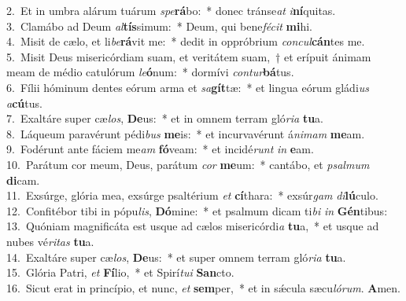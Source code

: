 {2.~}Et in umbra alárum tuárum \textit{spe}\textbf{rá}bo:~* donec tránse\textit{at} \textit{i}\textbf{ní}quitas.\\
{3.~}Clamábo ad Deum \textit{al}\textbf{tís}simum:~* Deum, qui bene\textit{fé}\textit{cit} \textbf{mi}hi.\\
{4.~}Misit de cælo, et li\textit{be}\textbf{rá}vit me:~* dedit in oppróbrium \textit{con}\textit{cul}\textbf{cán}tes me.\\
{5.~}Misit Deus misericórdiam suam, et veritátem suam,~† et erípuit ánimam meam de médio catulórum \textit{le}\textbf{ó}num:~* dormívi \textit{con}\textit{tur}\textbf{bá}tus.\\
{6.~}Fílii hóminum dentes eórum arma et \textit{sa}\textbf{gít}tæ:~* et lingua eórum gládi\textit{us} \textit{a}\textbf{cú}tus.\\
{7.~}Exaltáre super cæ\textit{los}, \textbf{De}us:~* et in omnem terram gló\textit{ri}\textit{a} \textbf{tu}a.\\
{8.~}Láqueum paravérunt pédi\textit{bus} \textbf{me}is:~* et incurvavérunt á\textit{ni}\textit{mam} \textbf{me}am.\\
{9.~}Fodérunt ante fáciem me\textit{am} \textbf{fó}veam:~* et incidé\textit{runt} \textit{in} \textbf{e}am.\\
{10.~}Parátum cor meum, Deus, parátum \textit{cor} \textbf{me}um:~* cantábo, et \textit{psal}\textit{mum} \textbf{di}cam.\\
{11.~}Exsúrge, glória mea, exsúrge psaltérium \textit{et} \textbf{cí}thara:~* exsúr\textit{gam} \textit{di}\textbf{lú}culo.\\
{12.~}Confitébor tibi in pópu\textit{lis}, \textbf{Dó}mine:~* et psalmum dicam ti\textit{bi} \textit{in} \textbf{Gén}tibus:\\
{13.~}Quóniam magnificáta est usque ad cælos misericórdi\textit{a} \textbf{tu}a,~* et usque ad nubes vé\textit{ri}\textit{tas} \textbf{tu}a.\\
{14.~}Exaltáre super cæ\textit{los}, \textbf{De}us:~* et super omnem terram gló\textit{ri}\textit{a} \textbf{tu}a.\\
{15.~}Glória Patri, \textit{et} \textbf{Fí}lio,~* et Spirí\textit{tu}\textit{i} \textbf{San}cto.\\
{16.~}Sicut erat in princípio, et nunc, \textit{et} \textbf{sem}per,~* et in sǽcula sæcu\textit{ló}\textit{rum}. \textbf{A}men.\\
